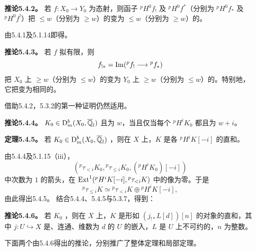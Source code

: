 \par\medskip\noindent\textbf{推论5.4.2。} 若 $f:X_0\to Y_0$ 为态射，则函子 ${}^pH^0f_!$ 及 ${}^pH^0f^*$（分别为 ${}^pH^0f_*$ 及 ${}^pH^0f^!$）把 $\le w$（分别为 $\ge w$）的变为 $\le w$（分别为 $\ge w$）的。

由5.4.1及5.1.14即得。
\par\medskip\noindent\textbf{推论5.4.3。} 若 $f$ 拟有限，则
\[
f_{!*}=\operatorname{Im}({}^pf_!\longrightarrow{}^pf_*)
\]
把 $X_0$ 上 $\ge w$（分别为 $\le w$）的变为 $Y_0$ 上 $\ge w$（分别为 $\le w$）的。特别地，它把变为相同的。

借助5.4.2，5.3.2的第一种证明仍然适用。

\par\medskip\noindent\textbf{推论5.4.4。} $K_0\in\mathrm{D}_m^b(X_0,\overline{\mathbb Q}_l)$ 且为 $w$，当且仅当每个 ${}^pH^iK_0$ 都且为 $w+i$。

\par\medskip\noindent\textbf{定理5.4.5。} 若 $K_0\in\mathrm{D}_m^b(X_0,\overline{\mathbb Q}_l)$ ，则在 $X$ 上，$K$ 是各 ${}^pH^iK[-i]$ 的直和。

由5.4.4及5.1.15（iii），
\[
({}^p\tau_{<i}K_0,{}^p\tau_{\le i}K_0,({}^pH^iK_0)[-i])
\]
中次数为 $1$ 的箭头，在 $\operatorname{Ext}^1({}^pH^iK[-i],{}^p\tau_{<i}K)$ 中的像为零。于是
\[
{}^p\tau_{\le i}K\simeq{}^p\tau_{<i}K\oplus{}^pH^iK[-i],
\]
由此得出5.4.5。
结合5.4.4、5.4.5与5.3.7，得到：

\par\medskip\noindent\textbf{推论5.4.6。} 若 $K_0$ ，则在 $X$ 上，$K$ 是形如 $(j_{!*}L[d])[n]$ 的对象的直和，其中 $j:U\hookrightarrow X$ 是、连通、维数为 $d$ 的 $U$ 的嵌入，$L$ 是 $U$ 上不可约的，$n$ 为整数。

下面两个由5.4.6得出的推论，分别推广了整体定理和局部定理。

